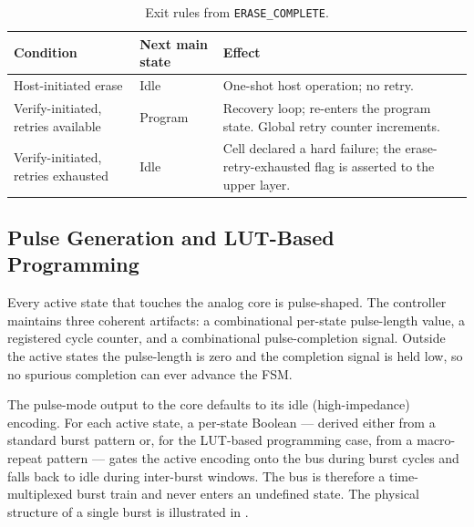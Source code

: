 \begin{table}[h]
    \centering
    \caption{Exit rules from \texttt{ERASE\_COMPLETE}.}
    \label{tab:erase-complete}
    \begin{tabularx}{\linewidth}{l l X}
        \toprule
        \textbf{Condition} & \textbf{Next main state} & \textbf{Effect} \\
        \midrule
        Host-initiated erase & Idle &
            One-shot host operation; no retry. \\
        Verify-initiated, retries available & Program &
            Recovery loop; re-enters the program state. Global retry
            counter increments. \\
        Verify-initiated, retries exhausted & Idle &
            Cell declared a hard failure; the erase-retry-exhausted
            flag is asserted to the upper layer. \\
        \bottomrule
    \end{tabularx}
\end{table}

\subsection{Pulse Generation and LUT-Based Programming}
\label{sec:rtl-controller-pulses}

Every active state that touches the analog core is pulse-shaped. The
controller maintains three coherent artifacts: a combinational per-state
pulse-length value, a registered cycle counter, and a combinational
pulse-completion signal. Outside the active states the pulse-length is
zero and the completion signal is held low, so no spurious completion can
ever advance the FSM.

The pulse-mode output to the core defaults to its idle (high-impedance)
encoding. For each active state, a per-state Boolean --- derived either
from a standard burst pattern or, for the LUT-based programming case,
from a macro-repeat pattern --- gates the active encoding onto the bus
during burst cycles and falls back to idle during inter-burst windows.
The bus is therefore a time-multiplexed burst train and never enters an
undefined state. The physical structure of a single burst is illustrated
in .

